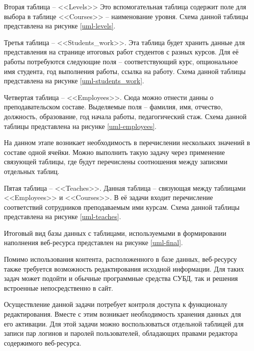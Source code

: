 Вторая таблица -- <<Levels>>
Это вспомогательная таблица содержит поле для выбора в таблице <<Courses>> -- наименование уровня.
Схема данной таблицы представлена на рисунке \ref{uml-levels}.

Третья таблица -- <<Students\_work>>.
Эта таблица будет хранить данные для представления на странице итоговых работ студентов с разных курсов.
Для её работы потребуются следующие поля -- соответствующий курс, опциональное имя студента, год выполнения работы, ссылка на работу.
Схема данной таблицы представлена на рисунке \ref{uml-students_work}.

Четвертая таблица -- <<Employees>>.
Сюда можно отнести данны о преподавательском составе.
Выделяемые поля -- фамилия, имя, отчество, должность, образование, год начала работы, педагогический стаж.
Схема данной таблицы представлена на рисунке \ref{uml-employees}.

На данном этапе возникает необходимость в перечислении нескольких значений в составе одной ячейки.
Можно выполнить такую задачу через применение связующей таблицы, где будут перечислены соотношения между записями отдельных таблиц.

Пятая таблица -- <<Teaches>>.
Данная таблица -- связующая между таблицами <<Employees>> и <<Courses>>.
В её задачи входит перечисление соответствий сотрудников преподаваемым ими курсам.
Схема данной таблицы представлена на рисунке \ref{uml-teaches}.

Итоговый вид базы данных с таблицами, используемыми в формировании наполнения веб-ресурса представлен на рисунке \ref{uml-final}.

Помимо использования контента, расположенного в базе данных, веб-ресурсу также требуется возможность редактирования исходной информации.
Для таких задач может подойти и обычные программные средства СУБД, так и решения встроенные непосредственно в сайт.

Осуществление данной задачи потребует контроля доступа к функционалу редактирования.
Вместе с этим возникает необходимость хранения данных для его активации.
Для этой задачи можно воспользоваться отдельной таблицей для записи пар логинов и паролей пользователей, обладающих правами редактора содержимого веб-ресурса.

